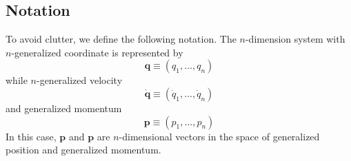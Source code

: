 \documentclass[../../../main.tex]{subfiles}
\begin{document}
\subsection{Notation}
To avoid clutter, we define the following notation.
The $n$-dimension system with $n$-generalized coordinate is represented by
\begin{equation*}
	\mathbf{q}\equiv(q_1,\dots,q_n)
\end{equation*}
while $n$-generalized velocity
\begin{equation*}
	\dot{\mathbf{q}}\equiv(\dot{q}_1,\dots,\dot{q}_n)
\end{equation*}
and generalized momentum
\begin{equation*}
	\mathbf{p}\equiv(p_1,\dots,p_n)
\end{equation*}
In this case, $\mathbf{p}$ and $\mathbf{p}$ are $n$-dimensional vectors in the space of generalized position and generalized momentum.
\end{document}
